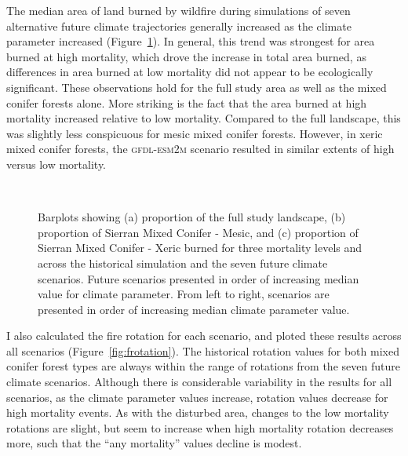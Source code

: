 The median area of land burned by wildfire during simulations of seven alternative future climate trajectories generally increased as the climate parameter increased (Figure~\ref{fig:dareacomp}). In general, this trend was strongest for area burned at high mortality, which drove the increase in total area burned, as differences in area burned at low mortality did not appear to be ecologically significant. These observations hold for the full study area as well as the mixed conifer forests alone. More striking is the fact that the area burned at high mortality increased relative to low mortality. Compared to the full landscape, this was slightly less conspicuous for mesic mixed conifer forests. However, in xeric mixed conifer forests, the \textsc{gfdl-esm2m} scenario resulted in similar extents of high versus low mortality.


\begin{figure}[!htbp]
  \centering
     \\
    \caption{Barplots showing (a) proportion of the full study landscape, (b) proportion of Sierran Mixed Conifer - Mesic, and (c) proportion of Sierran Mixed Conifer - Xeric burned for three mortality levels and across the historical simulation and the seven future climate scenarios. Future scenarios presented in order of increasing median value for climate parameter. From left to right, scenarios are presented in order of increasing median climate parameter value.}
  \label{fig:dareacomp}
\end{figure}

I also calculated the fire rotation for each scenario, and ploted these results across all scenarios (Figure~\ref{fig:frotation}). The historical rotation values for both mixed conifer forest types are always within the range of rotations from the seven future climate scenarios. Although there is considerable variability in the results for all scenarios, as the climate parameter values increase, rotation values decrease for high mortality events. As with the disturbed area, changes to the low mortality rotations are slight, but seem to increase when high mortality rotation decreases more, such that the ``any mortality'' values decline is modest.



